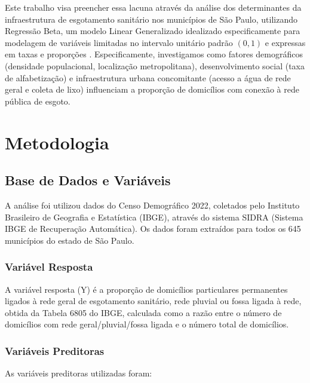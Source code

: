 \documentclass[12pt, a4paper]{article}
\begin{document}
Este trabalho visa preencher essa lacuna através da análise dos determinantes da infraestrutura de esgotamento sanitário nos municípios de São Paulo, utilizando Regressão Beta, um modelo Linear Generalizado idealizado especificamente para modelagem de variáveis limitadas no intervalo unitário padrão $(0,1)$ e expressas em taxas e proporções \cite{ferrari2004beta}. Especificamente, investigamos como fatores demográficos (densidade populacional, localização metropolitana), desenvolvimento social (taxa de alfabetização) e infraestrutura urbana concomitante (acesso a água de rede geral e coleta de lixo) influenciam a proporção de domicílios com conexão à rede pública de esgoto.

\section{Metodologia}

\subsection{Base de Dados e Variáveis}

A análise foi utilizou dados do Censo Demográfico 2022, coletados pelo Instituto Brasileiro de Geografia e Estatística (IBGE), através do sistema SIDRA (Sistema IBGE de Recuperação Automática). Os dados foram extraídos para todos os 645 municípios do estado de São Paulo.

\subsubsection{Variável Resposta}

A variável resposta (Y) é a proporção de domicílios particulares permanentes ligados à rede geral de esgotamento sanitário, rede pluvial ou fossa ligada à rede, obtida da Tabela 6805 do IBGE, calculada como a razão entre o número de domicílios com rede geral/pluvial/fossa ligada e o número total de domicílios.

\subsubsection{Variáveis Preditoras}

As variáveis preditoras utilizadas foram:
\end{document}
